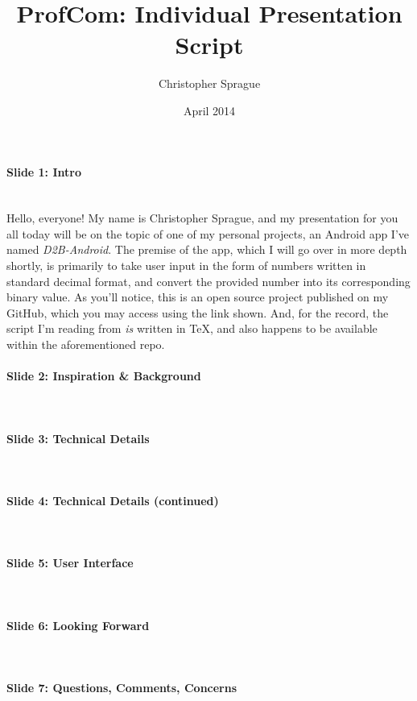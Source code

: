 \documentclass{article}
\title{ProfCom: Individual Presentation Script}
\author{Christopher Sprague}
\date{April 2014}
\begin{document}
	\maketitle
\paragraph{Slide 1: Intro} ~\\

Hello, everyone! My name is Christopher Sprague, and my presentation for 
you all today will be on the topic of one of my personal projects, an 
Android app I've named \emph{D2B-Android}. The premise of the app, which I will
go over in more depth shortly, is primarily to take user input in the
form of numbers written in standard decimal format, and convert the provided 
number into its corresponding binary value. As you'll notice, this is an 
open source project published on my GitHub, which you may access using the 
link shown. And, for the record, the script I'm reading from \emph{is} written 
in \TeX{}, and also happens to be available within the aforementioned repo.

\paragraph{Slide 2: Inspiration \& Background} ~\\
\paragraph{Slide 3: Technical Details} ~\\
\paragraph{Slide 4: Technical Details (continued)} ~\\
\paragraph{Slide 5: User Interface} ~\\
\paragraph{Slide 6: Looking Forward} ~\\
\paragraph{Slide 7: Questions, Comments, Concerns} ~\\
\end{document}
